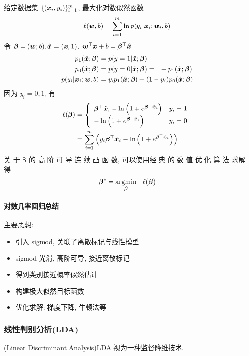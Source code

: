 给定数据集 $\{ (\bm{x}_i, y_i) \}_{i=1}^m$, 最大化对数似然函数
\begin{align*}
    \ell(\bm{w},b)=\sum_{i=1}^m\ln p(y_i|\bm{x}_i;\bm{w}_i,b)
\end{align*}
令 $\bm\beta=(\bm{w};b),\hat{\bm{x}}=(\bm{x},1)$, $\bm{w}^\top\bm{x}+b=\bm{\beta}^\top\hat{\bm{x}}$
\begin{align*}
    p_1(\hat{\bm{x}};\bm \beta)&=p(y=1|\hat{\bm{x}};\bm\beta)\\
    p_0(\hat{\bm{x}};\bm \beta)&=p(y=0|\hat{\bm{x}};\bm\beta)=1-p_1(\hat{\bm{x}};\bm \beta)\\
    p(y_i|\bm{x}_i;\bm{w},b)&=y_ip_1(\hat{\bm{x}};\bm \beta)+(1-y_i)p_0(\hat{\bm{x}};\bm \beta)
\end{align*}
因为 $y_i=0,1$, 有
\begin{align*}
    \ell(\bm\beta)&=\left\{ \begin{array}{ll}
        \bm{\beta}^\top \hat{\bm{x}}_i-\ln\left( 1+e^{\bm{\beta}^\top\hat{\bm{x}}_i} \right)& y_i=1\\
        -\ln\left( 1+e^{\bm{\beta}^\top\hat{\bm{x}}_i} \right) & y_i=0
    \end{array} \right.\\
    &=\sum_{i=1}^m\left( y_i\bm{\beta}^\top \hat{\bm{x}}_i-\ln\left( 1+e^{\bm{\beta}^\top\hat{\bm{x}}_i} \right) \right)
\end{align*}
关 于 $\bm\beta$ 的 高 阶 可 导 连 续 凸 函 数, 可以使用经 典 的 数 值 优 化 算 法  求解得
\begin{align*}
    \bm\beta^*=\operatorname*{argmin}_{\bm\beta}-\ell(\bm\beta)
\end{align*}

\paragraph{对数几率回归总结}
主要思想:
\begin{itemize}
    \item 引入 sigmod, 关联了离散标记与线性模型
    \item sigmod 光滑, 高阶可导, 接近离散标记
    \item 得到类别接近概率似然估计
    \item 构建极大似然目标函数
    \item 优化求解: 梯度下降, 牛顿法等
\end{itemize}


\subsubsection{线性判别分析(LDA)}
(Linear Discriminant Analysis)LDA 视为一种监督降维技术. 

